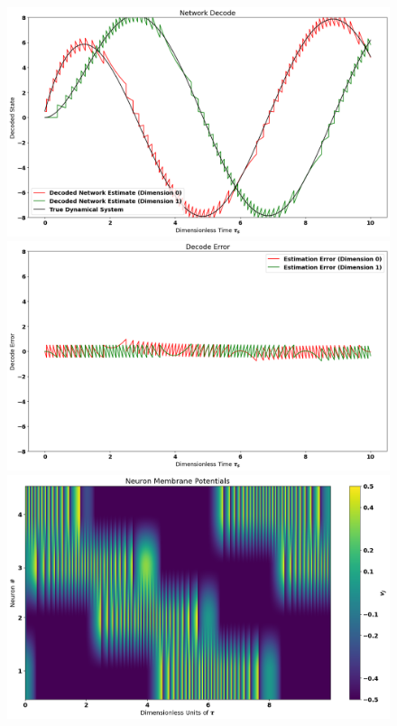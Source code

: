 \begin{figure}
    \centering
    \includegraphics[width=.75\linewidth]{figures/network_decode.png}

    \includegraphics[width=.75\linewidth]{figures/decode_error.png}

    \includegraphics[width=.7\linewidth]{figures/membrane_potential_image.png}
\end{figure}

\newpage


